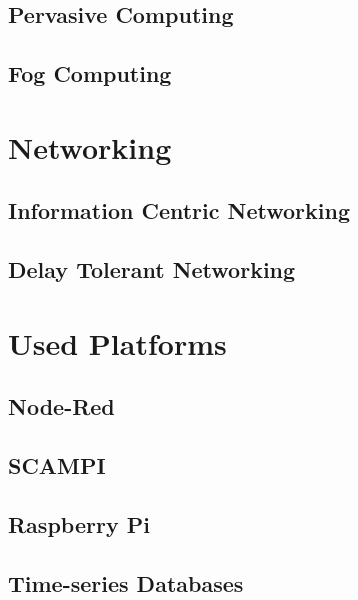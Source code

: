 \subsection{Pervasive Computing} 

\subsection{Fog Computing}



\section{Networking}
\subsection{Information Centric Networking}
\subsection{Delay Tolerant Networking}


\section{Used Platforms}
\subsection{Node-Red}
\subsection{SCAMPI}
\subsection{Raspberry Pi}
\subsection{Time-series Databases}


